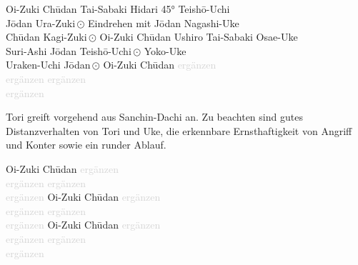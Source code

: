 \clearpage
\newpage
\begin{tcbitemize}[right=4pt,left=4pt,raster columns=3,raster equal height,colframe=GKD,colback=white,fonttitle=\bfseries]
	\tcbitem[squeezed title*={Kumite Ura 7}]
	Oi-Zuki Ch\={u}dan
	Tai-Sabaki Hidari 45° Teish\={o}-Uchi\\
	J\={o}dan Ura-Zuki\,\(\odot\)
	Eindrehen mit J\={o}dan Nagashi-Uke\\
	Ch\={u}dan Kagi-Zuki\,\(\odot\)
	\tcbitem[squeezed title*={Kumite Ura 8}]
	Oi-Zuki Ch\={u}dan
	Ushiro Tai-Sabaki Osae-Uke\\
	Suri-Ashi J\={o}dan Teish\={o}-Uchi\,\(\odot\)
	Yoko-Uke \\
	Uraken-Uchi J\={o}dan\,\(\odot\)
	\tcbitem[squeezed title*={Kumite Ura 9}]
	Oi-Zuki Ch\={u}dan
	\textcolor{lightgray}{ergänzen}\\
	\textcolor{lightgray}{ergänzen}
	\textcolor{lightgray}{ergänzen}\\
	\textcolor{lightgray}{ergänzen}
\end{tcbitemize}
\null\vfill\null
\begin{pfbox}
	Tori greift vorgehend aus Sanchin-Dachi an. Zu beachten sind gutes Distanzverhalten von Tori und Uke, die erkennbare Ernsthaftigkeit von Angriff und Konter sowie ein runder Ablauf.
\end{pfbox}
\null\vfill\null
\begin{tcbitemize}[right=4pt,left=4pt,raster columns=3,raster equal height,colframe=GKD,colback=white,fonttitle=\bfseries]
	\tcbitem[squeezed title*={Kumite Ura 10}]
	Oi-Zuki Ch\={u}dan
	\textcolor{lightgray}{ergänzen}\\
	\textcolor{lightgray}{ergänzen}
	\textcolor{lightgray}{ergänzen}\\
	\textcolor{lightgray}{ergänzen}
	\tcbitem[squeezed title*={Kumite Ura 11}]
	Oi-Zuki Ch\={u}dan
	\textcolor{lightgray}{ergänzen}\\
	\textcolor{lightgray}{ergänzen}
	\textcolor{lightgray}{ergänzen}\\
	\textcolor{lightgray}{ergänzen}
	\tcbitem[squeezed title*={Kumite Ura 12}]
	Oi-Zuki Ch\={u}dan
	\textcolor{lightgray}{ergänzen}\\
	\textcolor{lightgray}{ergänzen}
	\textcolor{lightgray}{ergänzen}\\
	\textcolor{lightgray}{ergänzen}
\end{tcbitemize}
\clearpage
\newpage
